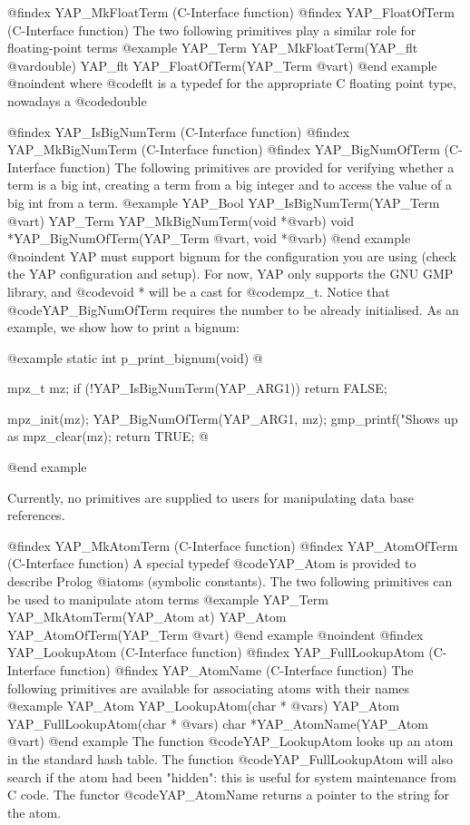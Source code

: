 {{{{{{{{{@findex YAP_MkFloatTerm (C-Interface function)
@findex YAP_FloatOfTerm (C-Interface function)
The two following primitives play a similar role for floating-point terms
@example
      YAP_Term YAP_MkFloatTerm(YAP_flt @var{double})
      YAP_flt  YAP_FloatOfTerm(YAP_Term @var{t})
@end example
@noindent
where @code{flt} is a typedef for the appropriate C floating point type,
nowadays a @code{double}

@findex YAP_IsBigNumTerm (C-Interface function)
@findex YAP_MkBigNumTerm (C-Interface function)
@findex YAP_BigNumOfTerm (C-Interface function)
The following primitives are provided for verifying whether a term is
a big int, creating a term from a big integer and to access the value
of a big int from a term.
@example
      YAP_Bool YAP_IsBigNumTerm(YAP_Term @var{t})
      YAP_Term YAP_MkBigNumTerm(void  *@var{b})
      void *YAP_BigNumOfTerm(YAP_Term @var{t}, void *@var{b})
@end example
@noindent
YAP must support bignum for the configuration you are using (check the
YAP configuration and setup). For now, YAP only supports the GNU GMP
library, and @code{void *} will be a cast for @code{mpz_t}. Notice
that @code{YAP_BigNumOfTerm} requires the number to be already
initialised. As an example, we show how to print a bignum:

@example
static int
p_print_bignum(void)
@{
  mpz_t mz;
  if (!YAP_IsBigNumTerm(YAP_ARG1))
    return FALSE;

  mpz_init(mz);
  YAP_BigNumOfTerm(YAP_ARG1, mz);
  gmp_printf("Shows up as %
  mpz_clear(mz);
  return TRUE;
@}
@end example


Currently, no primitives are supplied to users for manipulating data base
references. 

@findex YAP_MkAtomTerm (C-Interface function)
@findex YAP_AtomOfTerm (C-Interface function)
A special typedef @code{YAP_Atom} is provided to describe Prolog
@i{atoms} (symbolic constants). The two following primitives can be used
to manipulate atom terms
@example
      YAP_Term YAP_MkAtomTerm(YAP_Atom at)
      YAP_Atom YAP_AtomOfTerm(YAP_Term @var{t})
@end example
@noindent
@findex YAP_LookupAtom (C-Interface function)
@findex YAP_FullLookupAtom (C-Interface function)
@findex YAP_AtomName (C-Interface function)
The following primitives are available for associating atoms with their
names 
@example
      YAP_Atom  YAP_LookupAtom(char * @var{s})
      YAP_Atom  YAP_FullLookupAtom(char * @var{s})
      char     *YAP_AtomName(YAP_Atom @var{t})
@end example
The function @code{YAP_LookupAtom} looks up an atom in the standard hash
table. The function @code{YAP_FullLookupAtom} will also search if the
atom had been "hidden": this is useful for system maintenance from C
code. The functor @code{YAP_AtomName} returns a pointer to the string
for the atom.

}}}}}}}}}
